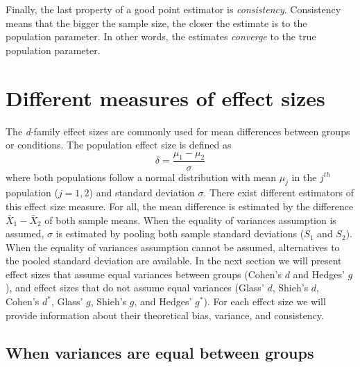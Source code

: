 \documentclass[
  english,
  man,floatsintext]{apa6}
\begin{document}
Finally, the last property of a good point estimator is \emph{consistency}. Consistency means that the bigger the sample size, the closer the estimate is to the population parameter. In other words, the estimates \emph{converge} to the true population parameter.

\hypertarget{different-measures-of-effect-sizes}{%
\section{Different measures of effect sizes}\label{different-measures-of-effect-sizes}}

The \emph{d}-family effect sizes are commonly used for mean differences between groups or conditions. The population effect size is defined as
\begin{equation} 
\delta = \frac{\mu_{1}-\mu_{2}}{\sigma} 
\label{eqn:Cohendelta}
\end{equation}
where both populations follow a normal distribution with mean \(\mu_j\) in the \(j^{th}\) population (\(j=1,2\)) and standard deviation \(\sigma\). There exist different estimators of this effect size measure. For all, the mean difference is estimated by the difference \(\bar{X}_1-\bar{X}_2\) of both sample means. When the equality of variances assumption is assumed, \(\sigma\) is estimated by pooling both sample standard deviations (\(S_1\) and \(S_2\)). When the equality of variances assumption cannot be assumed, alternatives to the pooled standard deviation are available. In the next section we will present effect sizes that assume equal variances between groups (Cohen's \(d\) and Hedges' \(g\)), and effect sizes that do not assume equal variances (Glass' \(d\), Shieh's \(d\), Cohen's \(d^*\), Glass' \(g\), Shieh's \(g\), and Hedges' \(g^*\)). For each effect size we will provide information about their theoretical bias, variance, and consistency.

\hypertarget{when-variances-are-equal-between-groups}{%
\subsection{When variances are equal between groups}\label{when-variances-are-equal-between-groups}}
\end{document}
